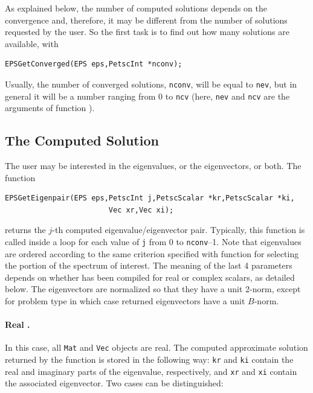 	As explained below, the number of computed solutions depends on the convergence and, therefore, it may be different from the number of solutions requested by the user. So the first task is to find out how many solutions are available, with
	\begin{Verbatim}[fontsize=\small]
	EPSGetConverged(EPS eps,PetscInt *nconv);
	\end{Verbatim}
Usually, the number of converged solutions, \texttt{nconv}, will be equal to \texttt{nev}, but in general it will be a number ranging from 0 to \texttt{ncv} (here, \texttt{nev} and \texttt{ncv} are the arguments of function ).

\subsection{The Computed Solution}

	The user may be interested in the eigenvalues, or the eigenvectors, or both. The function
	\begin{Verbatim}[fontsize=\small]
	EPSGetEigenpair(EPS eps,PetscInt j,PetscScalar *kr,PetscScalar *ki,
                        Vec xr,Vec xi);
	\end{Verbatim}
	\label{GetEigenpair}
returns the $j$-th computed eigenvalue/eigenvector pair. Typically, this function is called inside a loop for each value of \texttt{j} from 0 to \texttt{nconv}--1. Note that eigenvalues are ordered according to the same criterion specified with function  for selecting the portion of the spectrum of interest.
	The meaning of the last 4 parameters depends on whether \slepc has been compiled for real or complex scalars, as detailed below. The eigenvectors are normalized so that they have a unit 2-norm, except for problem type  in which case returned eigenvectors have a unit $B$-norm.

\paragraph{Real \slepc.} In this case, all \texttt{Mat} and \texttt{Vec} objects are real. The computed approximate solution returned by the function  is stored in the following way: \texttt{kr} and \texttt{ki} contain the real and imaginary parts of the eigenvalue, respectively, and \texttt{xr} and \texttt{xi} contain the associated eigenvector. Two cases can be distinguished:

